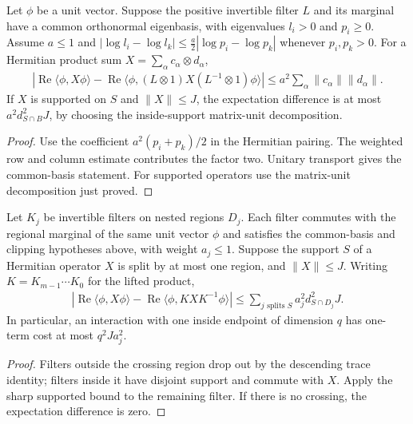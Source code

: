 \begin{theorem}
    \label{thm:patch_sharp_conjugation}
    \leanok
    Let $\phi$ be a unit vector. Suppose the positive invertible filter
    $L$ and its marginal have a common orthonormal eigenbasis, with
    eigenvalues $l_i>0$ and $p_i\ge0$. Assume $a\le1$ and
    $|\log l_i-\log l_k|\le\frac a2|\log p_i-\log p_k|$ whenever
    $p_i,p_k>0$. For a Hermitian product sum $X=\sum_\alpha c_\alpha\otimes d_\alpha$,
    \begin{align*}
        |\operatorname{Re}\langle\phi,X\phi\rangle
        -\operatorname{Re}\langle\phi,(L\otimes1)X(L^{-1}\otimes1)\phi\rangle|
        \le a^2\sum_\alpha\lVert c_\alpha\rVert\lVert d_\alpha\rVert.
    \end{align*}
    If $X$ is supported on $S$ and $\lVert X\rVert\le J$, the expectation
    difference is at most $a^2d_{S\cap B}^2J$, by choosing the inside-support
    matrix-unit decomposition.
\end{theorem}
\begin{proof}\leanok
    Use the coefficient $a^2(p_i+p_k)/2$ in the Hermitian pairing.
    The weighted row and column estimate contributes the factor two.
    Unitary transport gives the common-basis statement. For supported
    operators use the matrix-unit decomposition just proved.
\end{proof}

\begin{theorem}
    \label{thm:patch_sharp_chain}
    \leanok
    Let $K_j$ be invertible filters on nested regions $D_j$. Each filter
    commutes with the regional marginal of the same unit vector $\phi$
    and satisfies the common-basis and clipping hypotheses above, with
    weight $a_j\le1$. Suppose the support $S$ of a Hermitian operator $X$
    is split by at most one region, and $\lVert X\rVert\le J$. Writing
    $K=K_{m-1}\cdots K_0$ for the lifted product,
    \begin{align*}
        |\operatorname{Re}\langle\phi,X\phi\rangle
        -\operatorname{Re}\langle\phi,KXK^{-1}\phi\rangle|
        \le\sum_{j\text{ splits }S}a_j^2d_{S\cap D_j}^2J.
    \end{align*}
    In particular, an interaction with one inside endpoint of dimension
    $q$ has one-term cost at most $q^2Ja_j^2$.
\end{theorem}
\begin{proof}\leanok
    Filters outside the crossing region drop out by the descending
    trace identity; filters inside it have disjoint support and commute
    with $X$. Apply the sharp supported bound to the remaining filter.
    If there is no crossing, the expectation difference is zero.
\end{proof}

